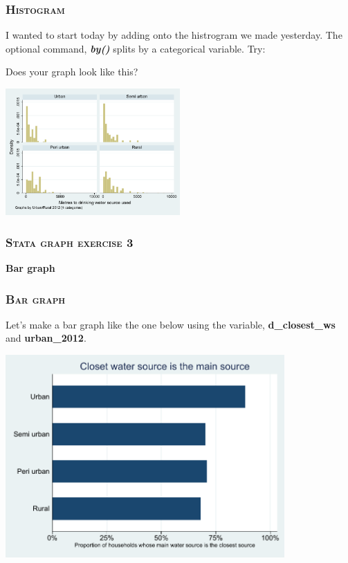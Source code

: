 \documentclass[10pt]{beamer}
\begin{document}
	\begin{frame}
	\frametitle{\textsc{Histogram}}
		 I wanted to start today by adding onto the histrogram we made yesterday.
		\onslide<2-> The optional command, \textbf{\textit{by()}} 
					 splits by a categorical variable. Try:
	
\begin{stlog}\end{stlog}
		 Does your graph look like this?
	
\begin{center}
    \includegraphics[width=0.5\textwidth]{hist_3.pdf}
\end{center}
	\end{frame}

	\begin{frame}
	\frametitle{\textsc{Stata graph exercise 3}}
		\begin{center}
		\Large \textbf{Bar graph}
		\end{center}
	\end{frame}		
	
	\begin{frame}
	\frametitle{\textsc{Bar graph}}
		Let's make a bar graph like the one below using the variable, \textbf{d\_closest\_ws} and \textbf{urban\_2012}.
		\vspace{1mm}
	
\begin{center}
    \includegraphics[width=0.8\textwidth]{bar_1.pdf}
\end{center}
	\end{frame}
	
\end{document}
